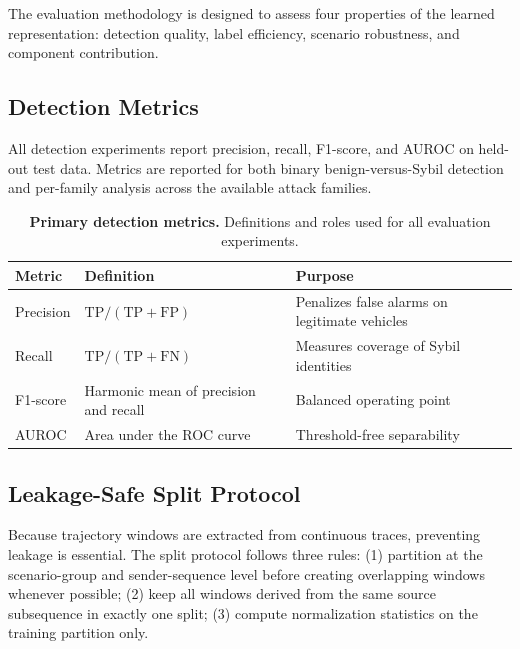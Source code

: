 \documentclass[12pt]{article}
\begin{document}
The evaluation methodology is designed to assess four properties of the learned representation: detection quality, label efficiency, scenario robustness, and component contribution.

\subsection{Detection Metrics}

All detection experiments report precision, recall, F1-score, and AUROC on held-out test data. Metrics are reported for both binary benign-versus-Sybil detection and per-family analysis across the available attack families.

\begin{table}[H]
\centering
\small
\begin{singlespace}
\begin{tabularx}{\textwidth}{@{}>{\RaggedRight\arraybackslash}p{1.6cm}>{\RaggedRight\arraybackslash}p{3.35cm}>{\RaggedRight\arraybackslash}X@{}}
\toprule
\textbf{Metric} & \textbf{Definition} & \textbf{Purpose} \\
\midrule
Precision & $\mathrm{TP}/(\mathrm{TP}+\mathrm{FP})$ & Penalizes false alarms on legitimate vehicles \\
Recall & $\mathrm{TP}/(\mathrm{TP}+\mathrm{FN})$ & Measures coverage of Sybil identities \\
F1-score & Harmonic mean of precision and recall & Balanced operating point \\
AUROC & Area under the ROC curve & Threshold-free separability \\
\bottomrule
\end{tabularx}
\end{singlespace}
\caption{\textbf{Primary detection metrics.} Definitions and roles used for all evaluation experiments.}
\label{tab:detection_metrics}
\end{table}

\subsection{Leakage-Safe Split Protocol}

Because trajectory windows are extracted from continuous traces, preventing leakage is essential. The split protocol follows three rules: (1) partition at the scenario-group and sender-sequence level before creating overlapping windows whenever possible; (2) keep all windows derived from the same source subsequence in exactly one split; (3) compute normalization statistics on the training partition only.
\end{document}
